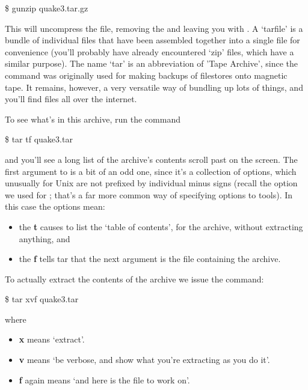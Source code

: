 \begin{ttoutenv}
\$ gunzip quake3.tar.gz
\end{ttoutenv}

This will uncompress the file, removing the  and leaving you with . A `tarfile'  is a bundle of individual files that have been assembled together into a single file for convenience (you'll probably have already encountered `zip' files, which have a similar purpose). The name `tar' is an abbreviation of 'Tape Archive', since the  command was originally used for making backups of filestores onto magnetic tape. It remains, however, a very versatile way of bundling up lots of things, and you'll find  files all over the internet.

To see what's in this archive, run the command

\begin{ttoutenv}
\$ tar tf quake3.tar
\end{ttoutenv}

\noindent and you'll see a long list of the archive's contents scroll past on the screen. The first argument to  is a bit of an odd one, since it's a collection of options, which unusually for Unix are not prefixed by individual minus signs (recall the  option we used for ; that's a far more common way of specifying options to tools). In this case the options mean:

\begin{itemize}
\item the \textbf{t} causes  to list the `table of contents', for the archive, without extracting anything, and
\item the \textbf{f} tells tar that the next argument is the file containing the archive.
\end{itemize}

\noindent To actually extract the contents of the archive we issue the command:

\begin{ttoutenv}
\$ tar xvf quake3.tar
\end{ttoutenv}

\noindent where

\begin{itemize}
\item \textbf{x} means `extract'.
\item \textbf{v} means `be verbose, and show what you're extracting as you do it'.
\item \textbf{f} again means `and here is the file to work on'.
\end{itemize}

